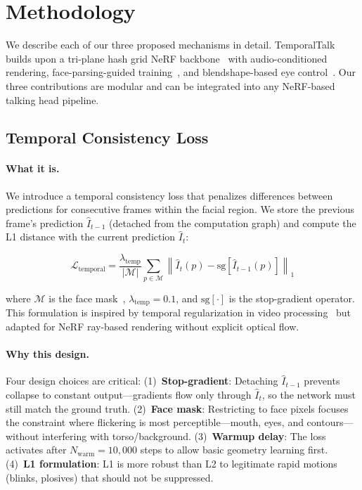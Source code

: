 \documentclass[10pt,twocolumn,letterpaper]{article}
\begin{document}
\section{Methodology}
\label{sec:methodology}

We describe each of our three proposed mechanisms in detail.
TemporalTalk builds upon a tri-plane hash grid NeRF backbone~\cite{mueller2022instant} with audio-conditioned rendering, face-parsing-guided training~\cite{yu2018bisenet}, and blendshape-based eye control~\cite{deng2019accurate,feng2021deca}.
Our three contributions are modular and can be integrated into any NeRF-based talking head pipeline.

\subsection{Temporal Consistency Loss}
\label{sec:temporal_loss}

\paragraph{What it is.}
We introduce a temporal consistency loss that penalizes differences between predictions for consecutive frames within the facial region.
We store the previous frame's prediction $\hat{I}_{t-1}$ (detached from the computation graph) and compute the L1 distance with the current prediction $\hat{I}_t$:

\begin{equation}
    \mathcal{L}_{\text{temporal}} = \frac{\lambda_{\text{temp}}}{|\mathcal{M}|} \sum_{p \in \mathcal{M}} \left\|\hat{I}_t(p) - \text{sg}\left[\hat{I}_{t-1}(p)\right]\right\|_1
    \label{eq:temporal_loss}
\end{equation}

where $\mathcal{M}$ is the face mask~\cite{yu2018bisenet}, $\lambda_{\text{temp}} = 0.1$, and $\text{sg}[\cdot]$ is the stop-gradient operator.
This formulation is inspired by temporal regularization in video processing~\cite{lai2018blind} but adapted for NeRF ray-based rendering without explicit optical flow.

\paragraph{Why this design.}
Four design choices are critical:
(1)~\textbf{Stop-gradient}: Detaching $\hat{I}_{t-1}$ prevents collapse to constant output---gradients flow only through $\hat{I}_t$, so the network must still match the ground truth.
(2)~\textbf{Face mask}: Restricting to face pixels focuses the constraint where flickering is most perceptible---mouth, eyes, and contours---without interfering with torso/background.
(3)~\textbf{Warmup delay}: The loss activates after $N_{\text{warm}} = 10{,}000$ steps to allow basic geometry learning first.
(4)~\textbf{L1 formulation}: L1 is more robust than L2 to legitimate rapid motions (blinks, plosives) that should not be suppressed.
\end{document}

